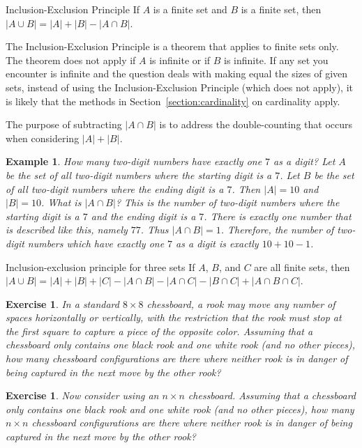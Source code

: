 \documentclass{book}
\newcounter{ekcounter}%
\theoremstyle{ekimcustom}
\newtheorem{example}[ekcounter]{Example}
\newtheorem{exercise}[ekcounter]{Exercise}
\begin{document}
\begin{btheorem}{Inclusion-Exclusion Principle}{}
If $A$ is a finite set and $B$ is a finite set, then $|A \cup B| = |A| + |B| - |A \cap B|$.
\end{btheorem}
\begin{bwarning}{}{}
The Inclusion-Exclusion Principle is a theorem that applies to finite sets only. The theorem does not apply if $A$ is infinite or if $B$ is infinite. If any set you encounter is infinite and the question deals with making equal the sizes of given sets, instead of using the Inclusion-Exclusion Principle (which does not apply), it is likely that the methods in Section~\ref{section:cardinality} on cardinality apply.
\end{bwarning}
The purpose of subtracting $|A \cap B|$ is to address the double-counting that occurs when considering $|A| + |B|$.

\begin{example}
How many two-digit numbers have exactly one $7$ as a digit? Let $A$ be the set of all two-digit numbers where the starting digit is a $7$. Let $B$ be the set of all two-digit numbers where the ending digit is a $7$. Then $|A|=10$ and $|B|=10$. What is $|A \cap B|$? This is the number of two-digit numbers where the starting digit is a $7$ and the ending digit is a $7$. There is exactly one number that is described like this, namely $77$. Thus $|A \cap B|=1$. Therefore, the number of two-digit numbers which have exactly one $7$ as a digit is exactly $10+10-1$.
\end{example}

\begin{btheorem}{Inclusion-exclusion principle for three sets}{}
If $A$, $B$, and $C$ are all finite sets, then $|A \cup B| = |A| + |B| + |C| - |A \cap B| - |A \cap C| - |B \cap C| + |A \cap B \cap C|$.
\end{btheorem}

\begin{exercise}
In a standard $8 \times 8$ chessboard, a rook may move any number of spaces horizontally or vertically, with the restriction that the rook must stop at the first square to capture a piece of the opposite color. Assuming that a chessboard only contains one black rook and one white rook (and no other pieces), how many chessboard configurations are there where neither rook is in danger of being captured in the next move by the other rook? \end{exercise}

\begin{exercise}
Now consider using an $n \times n$ chessboard. Assuming that a chessboard only contains one black rook and one white rook (and no other pieces), how many $n \times n$ chessboard configurations are there where neither rook is in danger of being captured in the next move by the other rook?
\end{exercise}
\end{document}
